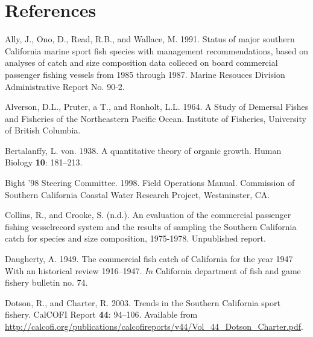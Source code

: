 \documentclass[12pt,]{article}
\begin{document}
\FloatBarrier

\FloatBarrier

\FloatBarrier

\FloatBarrier

\FloatBarrier

\newpage

\color{black}

\section*{References}\label{references}

\renewcommand{\thepage}{}

\hypertarget{refs}{}
\hypertarget{ref-Ally1991}{}
Ally, J., Ono, D., Read, R.B., and Wallace, M. 1991. Status of major
southern California marine sport fish species with management
recommendations, based on analyses of catch and size composition data
colleced on board commercial passenger fishing vessels from 1985 through
1987. Marine Resouces Division Administrative Report No. 90-2.

\hypertarget{ref-Alverson1964}{}
Alverson, D.L., Pruter, a T., and Ronholt, L.L. 1964. A Study of
Demersal Fishes and Fisheries of the Northeastern Pacific Ocean.
Institute of Fisheries, University of British Columbia.

\hypertarget{ref-vonB1938}{}
Bertalanffy, L. von. 1938. A quantitative theory of organic growth.
Human Biology \textbf{10}: 181--213.

\hypertarget{ref-Bight1998}{}
Bight '98 Steering Committee. 1998. Field Operations Manual. Commission
of Southern California Coastal Water Research Project, Westminster, CA.

\hypertarget{ref-Collins1978}{}
Collins, R., and Crooke, S. (n.d.). An evaluation of the commercial
passenger fishing vesselrecord system and the results of sampling the
Southern California catch for species and size composition, 1975-1978.
Unpublished report.

\hypertarget{ref-Daugherty1949}{}
Daugherty, A. 1949. The commercial fish catch of California for the year
1947 With an historical review 1916--1947. \emph{In} California
department of fish and game fishery bulletin no. 74.

\hypertarget{ref-Dotson2003}{}
Dotson, R., and Charter, R. 2003. Trends in the Southern California
sport fishery. CalCOFI Report \textbf{44}: 94--106. Available from
\url{http://calcofi.org/publications/calcofireports/v44/Vol_44_Dotson_Charter.pdf}.
\end{document}
